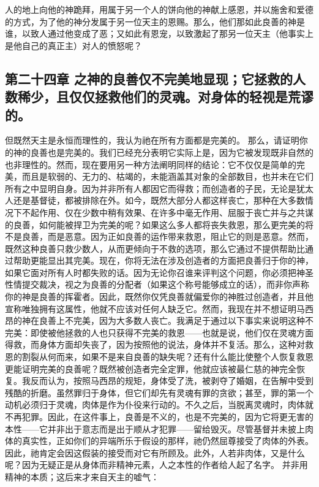 人的地上向他的神跪拜，用属于另一个人的饼向他的神献上感恩，并以施舍和爱德的方式，为了他的神分发属于另一位天主的恩赐。那么，他们那如此良善的神是谁，以致人通过他变成了恶；又如此有恩宠，以致激起了那另一位天主（他事实上是他自己的真正主）对人的愤怒呢？\par


\subsection{第二十四章 之神的良善仅不完美地显现；它拯救的人数稀少，且仅仅拯救他们的灵魂。对身体的轻视是荒谬的。}

但既然天主是永恒而理性的，我认为祂在所有方面都是完美的。  那么，请证明你的神的良善也是完美的。我们已经充分表明它实际上是，因为它被发现既非自然的也非理性的。然而，现在要用另一种方法阐明同样的结论：它不仅仅是简单的完美，而且是软弱的、无力的、枯竭的，未能涵盖其对象的全部数目，也并未在它们所有之中显明自身。因为并非所有人都因它而得救；而创造者的子民，无论是犹太人还是基督徒，都被排除在外。如今，既然大部分人都这样丧亡，那种在大多数情况下不起作用、仅在少数中稍有效果、在许多中毫无作用、屈服于丧亡并与之共谋的良善，如何能被捍卫为完美的呢？如果这么多人都将丧失救恩，那么更完美的将不是良善，而是恶意。因为正如良善的运作带来救恩，阻止它的则是恶意。然而，既然这种良善只救少数人，从而更倾向于不救的选项，那么它通过不提供帮助比通过帮助更能显出其完美。现在，你将无法在涉及创造者的方面把良善归于你的神，如果它面对所有人时都失败的话。因为无论你召谁来评判这个问题，你必须把神圣性情提交裁决，视之为良善的分配者（如果这个称号能够成立的话），而非你声称你的神是良善的挥霍者。因此，既然你仅凭良善就偏爱你的神胜过创造者，并且他宣称唯独拥有这属性，他就不应该对任何人缺乏它。然而，我现在并不想证明马西昂的神在良善上不完美，因为大多数人丧亡。我满足于通过以下事实来说明这种不完美：即使被他拯救的人也只获得不完美的救恩——也就是说，他们仅在灵魂方面得救，而身体方面却失丧了，因为按照他的说法，身体并不复活。那么，这种对救恩的割裂从何而来，如果不是来自良善的缺失呢？还有什么能比使整个人恢复救恩更能证明完美的良善呢？既然被创造者完全定罪，他就应该被最仁慈的神完全恢复。我反而认为，按照马西昂的规矩，身体受了洗，被剥夺了婚姻，在告解中受到残酷的折磨。虽然罪归于身体，但它们却先有灵魂有罪的贪欲；甚至，罪的第一个动机必须归于灵魂，肉体是作为仆役来行动的。不久之后，当脱离灵魂时，肉体就不再犯罪。因此，在这件事上，良善是不义的，也是不完美的，因为它将更无害的本性——它并非出于意志而是出于顺从才犯罪——留给毁灭。尽管基督并未披上肉体的真实性，正如你们的异端所乐于假设的那样，祂仍然屈尊接受了肉体的外表。因此，祂肯定会因这假装的接受而对它有所顾及。此外，人若非肉体，又是什么呢？因为无疑正是从身体而非精神元素，人之本性的作者给人起了名字。 并非用精神的本质；这后来才来自天主的嘘气： 